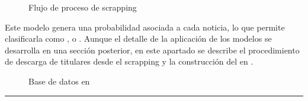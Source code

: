 \documentclass[letterpaper,10pt,spanish]{sphinxmanual}
\begin{document}
\begin{figure}[htbp]
\centering
\capstart

\noindent{}
\caption{ Flujo de proceso de scrapping}\label{\detokenize{DatosPreparacion:id3}}\end{figure}

\sphinxAtStartPar
Este modelo genera una probabilidad asociada a cada noticia, lo que permite clasificarla como ,  o . Aunque el detalle de la aplicación de los modelos se desarrolla en una sección posterior, en este apartado se describe el procedimiento de descarga de titulares desde el scrapping y la construcción del  en .

\begin{figure}[htbp]
\centering
\capstart

\noindent{}
\caption{ Base de datos en }\label{\detokenize{DatosPreparacion:fig-snowflake-noticias}}\end{figure}


\bigskip\hrule\bigskip
\end{document}

